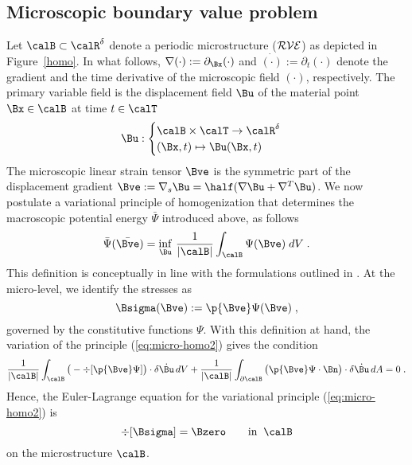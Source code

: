 \documentclass[final,3p,times]{elsarticle}
\begin{document}
\subsection{Microscopic boundary value problem}
Let $\calB\subset\calR^\delta$ denote a periodic microstructure ($\cal{RVE}$) as depicted in Figure~\ref{homo}.  
In what follows, $\nabla (\cdot)
:= \partial_{\Bx}(\cdot)$ and $\dot{(\cdot)} := \partial_{t}(\cdot)$
denote the gradient and the time derivative of the microscopic field
$(\cdot)$, respectively. The primary variable field is the {displacement field} $\Bu$ of the material point $\Bx\in\calB$ at time $t \in \calT$
\begin{equation}
\Bu : 
\begin{cases}
\calB \times \calT \rightarrow \calR^\delta \\
(\Bx, t) \mapsto \Bu(\Bx, t)
\end{cases} 
\label{eq:micro-homo1}
\end{equation}
%
The microscopic linear strain tensor $\Bve$ is the symmetric part of the displacement gradient
$\Bve:= \nabla_s\Bu = \half (\nabla\Bu
+ \nabla^T\Bu)$. We now postulate a variational principle of homogenization that determines the macroscopic potential energy $\bar\Psi$ introduced above, as follows
\begin{equation}
%
\bar\Psi(\bar\Bve) = \inf_{\Bu}  \, \frac{1}{|\calB|} \int_{\calB}  \Psi(\Bve) \; dV \; .
\label{eq:micro-homo2}
\end{equation}
%
This definition is conceptually in line with the formulations outlined in \citet{miehe02}.
%
At the micro-level, we identify the stresses as 
\begin{equation}
\Bsigma(\Bve) := \p{\Bve} \Psi(\Bve) \; ,
\label{eq:micro-homo3}
\end{equation}
%
governed by the constitutive functions $\Psi$. With this definition at hand, the
variation of the principle (\ref{eq:micro-homo2}) gives the condition
%
\begin{equation}
\frac{1}{|\calB|} \int_\calB \big(- \div [\p{\Bve}\Psi]\big)
\cdot \delta\dot\Bu \,dV + \frac{1}{|\calB|} \int_{\partial\calB}
\big(\p{\Bve}\Psi\cdot\Bn\big) \cdot\delta\dot\Bu \,dA = 0 \; .
\label{eq:micro-homo4}
\end{equation}
%
Hence, the Euler-Lagrange equation for the variational principle (\ref{eq:micro-homo2}) is
%
\begin{equation}
\div[ \Bsigma] = \Bzero \qquad \mbox{in} \; \;\calB
\label{eq:micro-homo5}
\end{equation}
%
on the microstructure $\calB$. 
%
\end{document}
